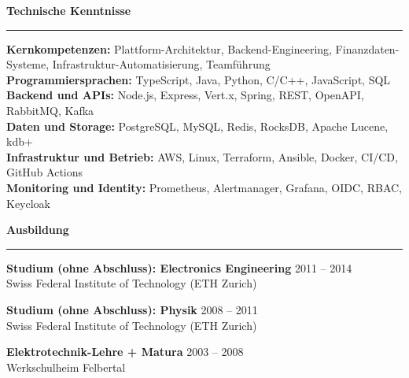 \documentclass[11pt,a4paper]{article}
\newcommand{\sectionspacebefore}{0.85em}
\newcommand{\sectionspacetoline}{-0.12em}
\newcommand{\sectionspacetocontent}{0.48em}
\newcommand{\cvsection}[1]{
  \par\vspace{\sectionspacebefore}
  {\large\bfseries\color{black}#1}\par
  \vspace{\sectionspacetoline}
  \noindent\rule{\textwidth}{0.45pt}\par
  \vspace{\sectionspacetocontent}
}
\begin{document}
\cvsection{Technische Kenntnisse}
\textbf{Kernkompetenzen:} Plattform-Architektur, Backend-Engineering, Finanzdaten-Systeme, Infrastruktur-Automatisierung, Teamführung\\
\textbf{Programmiersprachen:} TypeScript, Java, Python, C/C++, JavaScript, SQL\\
\textbf{Backend und APIs:} Node.js, Express, Vert.x, Spring, REST, OpenAPI, RabbitMQ, Kafka\\
\textbf{Daten und Storage:} PostgreSQL, MySQL, Redis, RocksDB, Apache Lucene, kdb+\\
\textbf{Infrastruktur und Betrieb:} AWS, Linux, Terraform, Ansible, Docker, CI/CD, GitHub Actions\\
\textbf{Monitoring und Identity:} Prometheus, Alertmanager, Grafana, OIDC, RBAC, Keycloak

\cvsection{Ausbildung}
\textbf{Studium (ohne Abschluss): Electronics Engineering} \hfill 2011 -- 2014\\
Swiss Federal Institute of Technology (ETH Zurich)

\vspace{0.15em}
\textbf{Studium (ohne Abschluss): Physik} \hfill 2008 -- 2011\\
Swiss Federal Institute of Technology (ETH Zurich)

\vspace{0.15em}
\textbf{Elektrotechnik-Lehre + Matura} \hfill 2003 -- 2008\\
Werkschulheim Felbertal
\end{document}
